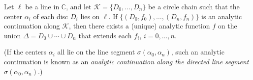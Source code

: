 Let $\ell$ be a line in $\mathbb{C}$, and let $\mathcal{K} = \{D_0, \ldots, D_n\}$ be a circle chain such that the center $\alpha_i$ of each disc $D_i$ lies on $\ell$. If $\{(D_0, f_0), \ldots, (D_n, f_n)\}$ is an analytic continuation along $\mathcal{K}$, then there exists a (unique) analytic function $f$ on the union $\Delta = D_0 \cup \cdots \cup D_n$ that extends each $f_i$, $i = 0, \ldots, n$.

(If the centers $\alpha_i$ all lie on the line segment $\sigma(\alpha_0, \alpha_n)$, such an analytic continuation is known as an \textit{analytic continuation along the directed line segment} $\sigma(\alpha_0, \alpha_n)$.)
